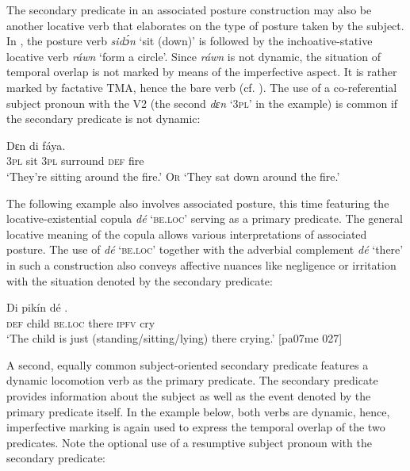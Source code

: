 The secondary predicate in an associated posture construction may also be another locative verb that elaborates on the type of posture taken by the subject. In , the posture verb \textit{sidɔ́n} ‘sit (down)’ is followed by the inchoative-stative locative verb \textit{ráwn} ‘form a circle’. Since \textit{ráwn} is not dynamic, the situation of temporal overlap is not marked by means of the imperfective aspect. It is rather marked by factative TMA, hence the bare verb (cf. ). The use of a co-referential subject pronoun with the V2 (the second \textit{dɛn} ‘\textsc{3pl’} in the example) is common if the secondary predicate is not dynamic:


\ea%
    \label{ex:key:1597}





        \textstylePichitranslationZchn{} Dɛn              di  fáya.\\
\textsc{3pl}    sit    \textsc{3pl}    surround  \textsc{def}  fire\\

\glt ‘They’re sitting around the fire.’ \textsc{Or} ‘They sat down around the fire.’\textstylePichiglossZchn{ [ro05ee 115]}
\z

The following example also involves associated posture, this time featuring the locative-existential copula \textit{dé} \textsc{‘be.loc’} serving as a primary predicate. The general locative meaning of the copula allows various interpretations of associated posture. The use of \textit{dé} \textsc{‘be.loc’} together with the adverbial complement \textit{dé} ‘there’ in such a construction also conveys affective nuances like negligence or irritation with the situation denoted by the secondary predicate:


\ea%
    \label{ex:key:1598}
    \gll Di  pikín      dé      .\\
\textsc{def}  child  \textsc{be.loc}  there  \textsc{ipfv}  cry\\

\glt ‘The child is just (standing/sitting/lying) there crying.’ [pa07me 027]
\z

A second, equally common subject-oriented secondary predicate features a dynamic locomotion verb as the primary predicate. The secondary predicate provides information about the subject as well as the event denoted by the primary predicate itself. In the example below, both verbs are dynamic, hence, imperfective marking is again used to express the temporal overlap of the two predicates. Note the optional use of a resumptive subject pronoun with the secondary predicate: 


